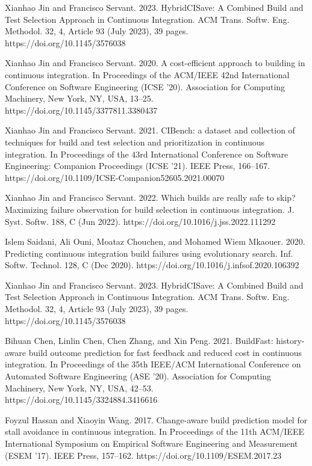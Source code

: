 \newpage
\begin{thebibliography}{8}

Xianhao Jin and Francisco Servant. 2023. HybridCISave: A Combined Build and Test Selection
Approach in Continuous Integration. ACM Trans. Softw. Eng. Methodol. 32, 4, Article 93 (July
2023), 39 pages. https://doi.org/10.1145/3576038

Xianhao Jin and Francisco Servant. 2020. A cost-efficient approach to building in continuous
integration. In Proceedings of the ACM/IEEE 42nd International Conference on Software Engineering
(ICSE '20). Association for Computing Machinery, New York, NY, USA, 13–25.
https://doi.org/10.1145/3377811.3380437

Xianhao Jin and Francisco Servant. 2021. CIBench: a dataset and collection of techniques for
build and test selection and prioritization in continuous integration. In Proceedings of the
43rd International Conference on Software Engineering: Companion Proceedings (ICSE '21). IEEE
Press, 166–167. https://doi.org/10.1109/ICSE-Companion52605.2021.00070

Xianhao Jin and Francisco Servant. 2022. Which builds are really safe to skip? Maximizing failure
observation for build selection in continuous integration. J. Syst. Softw. 188, C (Jun 2022).
https://doi.org/10.1016/j.jss.2022.111292

Islem Saidani, Ali Ouni, Moataz Chouchen, and Mohamed Wiem Mkaouer. 2020. Predicting continuous
integration build failures using evolutionary search. Inf. Softw. Technol. 128, C (Dec 2020).
https://doi.org/10.1016/j.infsof.2020.106392

Xianhao Jin and Francisco Servant. 2023. HybridCISave: A Combined Build and Test Selection
Approach in Continuous Integration. ACM Trans. Softw. Eng. Methodol. 32, 4, Article 93 (July
2023), 39 pages. https://doi.org/10.1145/3576038

Bihuan Chen, Linlin Chen, Chen Zhang, and Xin Peng. 2021. BuildFast: history-aware build outcome
prediction for fast feedback and reduced cost in continuous integration. In Proceedings of the
35th IEEE/ACM International Conference on Automated Software Engineering (ASE '20). Association
for Computing Machinery, New York, NY, USA, 42–53. https://doi.org/10.1145/3324884.3416616

Foyzul Hassan and Xiaoyin Wang. 2017. Change-aware build prediction model for stall avoidance in
continuous integration. In Proceedings of the 11th ACM/IEEE International Symposium on Empirical
Software Engineering and Measurement (ESEM '17). IEEE Press, 157–162.
https://doi.org/10.1109/ESEM.2017.23


\end{thebibliography}
